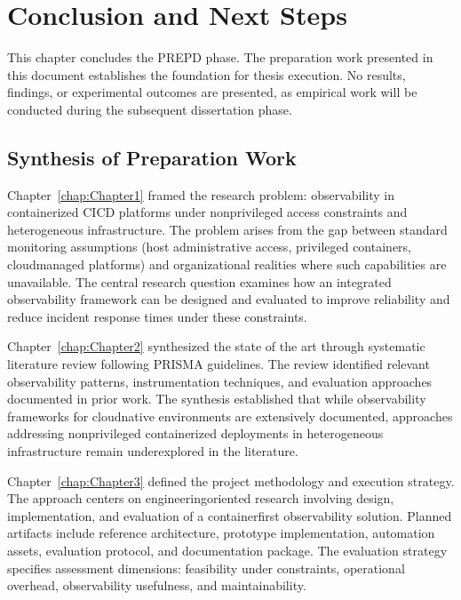 
\chapter{Conclusion and Next Steps}
\label{chap:Chapter4}

This chapter concludes the \ac{PREPD} phase. The preparation work presented in this document establishes the foundation for thesis execution. No results, findings, or experimental outcomes are presented, as empirical work will be conducted during the subsequent dissertation phase.

\section{Synthesis of Preparation Work}

Chapter~\ref{chap:Chapter1} framed the research problem: observability in containerized \ac{CICD} platforms under non\-privileged access constraints and heterogeneous infrastructure. The problem arises from the gap between standard monitoring assumptions (host administrative access, privileged containers, cloud\-managed platforms) and organizational realities where such capabilities are unavailable. The central research question examines how an integrated observability framework can be designed and evaluated to improve reliability and reduce incident response times under these constraints.

Chapter~\ref{chap:Chapter2} synthesized the state of the art through systematic literature review following \ac{PRISMA} guidelines. The review identified relevant observability patterns, instrumentation techniques, and evaluation approaches documented in prior work. The synthesis established that while observability frameworks for cloud\-native environments are extensively documented, approaches addressing non\-privileged containerized deployments in heterogeneous infrastructure remain underexplored in the literature.

Chapter~\ref{chap:Chapter3} defined the project methodology and execution strategy. The approach centers on engineering\-oriented research involving design, implementation, and evaluation of a container\-first observability solution. Planned artifacts include reference architecture, prototype implementation, automation assets, evaluation protocol, and documentation package. The evaluation strategy specifies assessment dimensions: feasibility under constraints, operational overhead, observability usefulness, and maintainability.

